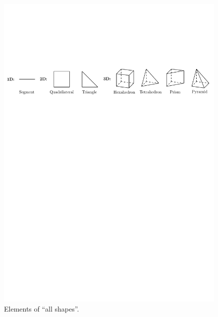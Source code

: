 \begin{figure}[!ht]
\begin{center}
\includegraphics[scale=0.75]{./figures/ElementsAllShapes.pdf}
\caption{Elements of ``all shapes''.}\label{fig:elementsallshapes}
\end{center}
\end{figure}


